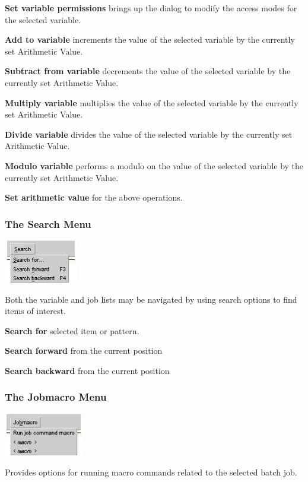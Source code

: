 \textbf{Set variable permissions} brings up the dialog to modify the
access modes for the selected variable.

\textbf{Add to variable} increments the value of the selected variable
by the currently set Arithmetic Value.

\textbf{Subtract from variable} decrements the value of the selected
variable by the currently set Arithmetic Value.

\textbf{Multiply variable} multiplies the value of the selected variable
by the currently set Arithmetic Value.

\textbf{Divide variable} divides the value of the selected variable by
the currently set Arithmetic Value.

\textbf{Modulo variable} performs a modulo on the value of the selected
variable by the currently set Arithmetic Value.

\textbf{Set arithmetic value} for the above operations.

\subsubsection{The Search Menu}
 \includegraphics[width=3.193cm,height=1.879cm]{img/ref22.jpg} 

Both the variable and job lists may be navigated by using search options
to find items of interest.

\textbf{Search for} selected item or pattern.

\textbf{Search forward} from the current position

\textbf{Search backward} from the current position

\subsubsection{The Jobmacro Menu}
 \includegraphics[width=3.454cm,height=1.879cm]{img/ref23.jpg} 

Provides options for running macro commands related to the selected
batch job.

